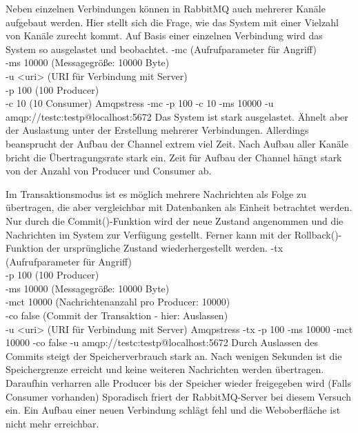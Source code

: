 \documentclass[	a4paper,
			11pt,
			titlepage,
			oneside,
			fleqn,
			listof=totoc,
			parskip,
			chapterprefix=false,
			numbers=noenddot]{scrreprt}
\begin{document}
\clearpage		
		{Neben einzelnen Verbindungen können in RabbitMQ auch mehrerer Kanäle aufgebaut werden. Hier stellt sich die Frage, wie das System mit einer Vielzahl von Kanäle zurecht kommt. Auf Basis einer einzelnen Verbindung wird das System so ausgelastet und beobachtet. }%
		{%
		 -mc (Aufrufparameter für Angriff) \\
		 -ms 10000 (Messagegröße: 10000 Byte) \\
		 -u <uri> (URI für Verbindung mit Server) \\
		 -p 100 (100 Producer) \\
		 -c 10 (10 Consumer)
		}%
		{Amqpstress -mc -p 100 -c 10 -ms 10000 -u amqp://testc:testp@localhost:5672}%
		{Das System ist stark ausgelastet. Ähnelt aber der Auslastung unter der Erstellung mehrerer Verbindungen. Allerdings beansprucht  der Aufbau der Channel extrem viel Zeit. Nach Aufbau aller Kanäle bricht die Übertragungsrate stark ein.}
		{Zeit für Aufbau der Channel hängt stark von der Anzahl von Producer und Consumer ab.}

\clearpage
		{Im Transaktionsmodus ist es möglich mehrere Nachrichten als Folge zu übertragen, die aber vergleichbar mit Datenbanken als Einheit betrachtet werden. Nur durch die Commit()-Funktion wird der neue Zustand angenommen und die Nachrichten im System zur Verfügung gestellt. Ferner kann mit der Rollback()-Funktion der ursprüngliche Zustand wiederhergestellt werden.}%
		{%
		 -tx (Aufrufparameter für Angriff) \\
		 -p 100 (100 Producer) \\
		 -ms 10000 (Messagegröße: 10000 Byte) \\
		 -mct 10000 (Nachrichtenanzahl pro Producer: 10000) \\
		 -co false (Commit der Transaktion - hier: Auslassen) \\
		 -u <uri> (URI für Verbindung mit Server)
		}%
		{Amqpstress -tx -p 100 -ms 10000 -mct 10000 -co false -u amqp://testc:testp@localhost:5672}%
		{Durch Auslassen des Commits steigt der Speicherverbrauch stark an. Nach wenigen Sekunden ist die Speichergrenze erreicht und keine weiteren Nachrichten werden übertragen. Daraufhin verharren alle Producer bis der Speicher wieder freigegeben wird (Falls Consumer vorhanden) }
		{Sporadisch friert der RabbitMQ-Server bei diesem Versuch ein. Ein Aufbau einer neuen Verbindung schlägt fehl und die Weboberfläche ist nicht mehr erreichbar.}
\end{document}
